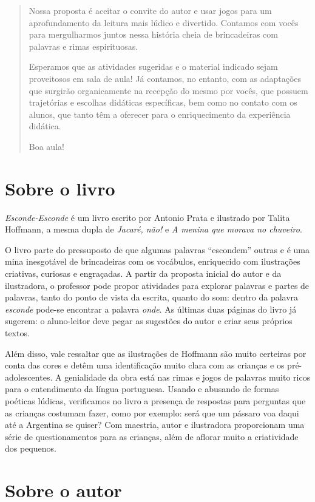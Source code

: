 \documentclass[11pt]{extarticle}
\begin{document}
\begin{abstract}
Nossa proposta é aceitar o convite do autor e usar jogos para um aprofundamento da leitura mais lúdico e divertido. Contamos com vocês para mergulharmos juntos nessa história cheia de brincadeiras com palavras e rimas espirituosas. 

Esperamos que as atividades sugeridas e o material indicado sejam proveitosos em sala de aula! Já contamos, no entanto, com as adaptações
que surgirão organicamente na recepção do mesmo por vocês, que possuem 
trajetórias e escolhas didáticas específicas, bem como no contato com os 
alunos, que tanto têm a oferecer para o enriquecimento da experiência didática.

Boa aula!

\end{abstract}

\section{Sobre o livro}

\textit{Esconde-Esconde} é um livro escrito por Antonio Prata e ilustrado por Talita Hoffmann, a mesma dupla de \textit{Jacaré, não!} e \textit{A menina que morava no chuveiro}. 

O livro parte do pressuposto de que algumas palavras “escondem” outras e é uma mina inesgotável de brincadeiras com os vocábulos, enriquecido com ilustrações criativas, curiosas e engraçadas. A partir da proposta inicial do autor e da ilustradora, o professor pode propor atividades para explorar palavras e partes de palavras, tanto do ponto de vista da escrita, quanto do som: dentro da palavra \textit{esconde} pode-se encontrar a palavra \textit{onde}. As últimas duas páginas do livro já sugerem: o aluno-leitor deve pegar as sugestões do autor e criar seus próprios textos.

Além disso, vale ressaltar que as ilustrações de Hoffmann são muito certeiras por conta das cores e detêm uma identificação muito clara com as crianças e os pré-adolescentes. A genialidade da obra está nas rimas e jogos de palavras muito ricos para o entendimento da língua portuguesa. Usando e abusando de formas poéticas lúdicas, verificamos no livro a presença de respostas para perguntas que as crianças costumam fazer, como por exemplo: será que um pássaro voa daqui até a Argentina se quiser? Com maestria, autor e ilustradora proporcionam uma série de questionamentos para as crianças, além de aflorar muito a criatividade dos pequenos.

\section{Sobre o autor}
\end{document}
